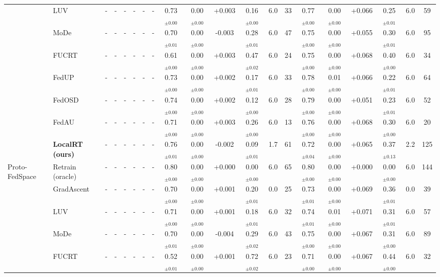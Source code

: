 \begin{table}[t]
\begin{tabular}{ll|cccccc|cccccc|cccccc}
 & LUV & - & - & - & - & - & - & 0.73$_{\pm0.00}$ & 0.00$_{\pm0.00}$ & +0.003 & 0.16$_{\pm0.00}$ & 6.0 & 33 & 0.77$_{\pm0.00}$ & 0.00$_{\pm0.00}$ & +0.066 & 0.25$_{\pm0.01}$ & 6.0 & 59\\
 & MoDe & - & - & - & - & - & - & 0.70$_{\pm0.01}$ & 0.00$_{\pm0.00}$ & -0.003 & 0.28$_{\pm0.01}$ & 6.0 & 47 & 0.75$_{\pm0.00}$ & 0.00$_{\pm0.00}$ & +0.055 & 0.30$_{\pm0.01}$ & 6.0 & 95\\
 & FUCRT & - & - & - & - & - & - & 0.61$_{\pm0.00}$ & 0.00$_{\pm0.00}$ & +0.003 & 0.47$_{\pm0.02}$ & 6.0 & 24 & 0.75$_{\pm0.00}$ & 0.00$_{\pm0.00}$ & +0.068 & 0.40$_{\pm0.00}$ & 6.0 & 34\\
 & FedUP & - & - & - & - & - & - & 0.73$_{\pm0.00}$ & 0.00$_{\pm0.00}$ & +0.002 & 0.17$_{\pm0.01}$ & 6.0 & 33 & 0.78$_{\pm0.00}$ & 0.01$_{\pm0.00}$ & +0.066 & 0.22$_{\pm0.01}$ & 6.0 & 64\\
 & FedOSD & - & - & - & - & - & - & 0.74$_{\pm0.00}$ & 0.00$_{\pm0.00}$ & +0.002 & 0.12$_{\pm0.00}$ & 6.0 & 28 & 0.79$_{\pm0.00}$ & 0.00$_{\pm0.00}$ & +0.051 & 0.23$_{\pm0.01}$ & 6.0 & 52\\
 & FedAU & - & - & - & - & - & - & 0.71$_{\pm0.00}$ & 0.00$_{\pm0.00}$ & +0.003 & 0.26$_{\pm0.00}$ & 6.0 & 13 & 0.76$_{\pm0.00}$ & 0.00$_{\pm0.00}$ & +0.068 & 0.30$_{\pm0.00}$ & 6.0 & 20\\
 & \textbf{LocalRT (ours)} & - & - & - & - & - & - & 0.76$_{\pm0.01}$ & 0.00$_{\pm0.00}$ & -0.002 & 0.09$_{\pm0.01}$ & 1.7 & 61 & 0.72$_{\pm0.04}$ & 0.00$_{\pm0.00}$ & +0.065 & 0.37$_{\pm0.13}$ & 2.2 & 125\\
\midrule
Proto-FedSpace & Retrain (oracle) & - & - & - & - & - & - & 0.80$_{\pm0.00}$ & 0.00$_{\pm0.00}$ & +0.000 & 0.00$_{\pm0.00}$ & 6.0 & 65 & 0.80$_{\pm0.00}$ & 0.00$_{\pm0.00}$ & +0.000 & 0.00$_{\pm0.00}$ & 6.0 & 144\\
 & GradAscent & - & - & - & - & - & - & 0.70$_{\pm0.00}$ & 0.00$_{\pm0.00}$ & +0.001 & 0.20$_{\pm0.01}$ & 0.0 & 25 & 0.73$_{\pm0.01}$ & 0.00$_{\pm0.00}$ & +0.069 & 0.36$_{\pm0.01}$ & 0.0 & 39\\
 & LUV & - & - & - & - & - & - & 0.71$_{\pm0.00}$ & 0.00$_{\pm0.00}$ & +0.001 & 0.18$_{\pm0.01}$ & 6.0 & 32 & 0.74$_{\pm0.01}$ & 0.01$_{\pm0.00}$ & +0.071 & 0.31$_{\pm0.01}$ & 6.0 & 57\\
 & MoDe & - & - & - & - & - & - & 0.70$_{\pm0.01}$ & 0.00$_{\pm0.00}$ & -0.004 & 0.29$_{\pm0.02}$ & 6.0 & 43 & 0.75$_{\pm0.00}$ & 0.00$_{\pm0.00}$ & +0.067 & 0.31$_{\pm0.00}$ & 6.0 & 89\\
 & FUCRT & - & - & - & - & - & - & 0.52$_{\pm0.01}$ & 0.00$_{\pm0.00}$ & +0.001 & 0.72$_{\pm0.02}$ & 6.0 & 23 & 0.71$_{\pm0.00}$ & 0.00$_{\pm0.00}$ & +0.067 & 0.44$_{\pm0.00}$ & 6.0 & 32\\

\end{tabular}
\end{table}
